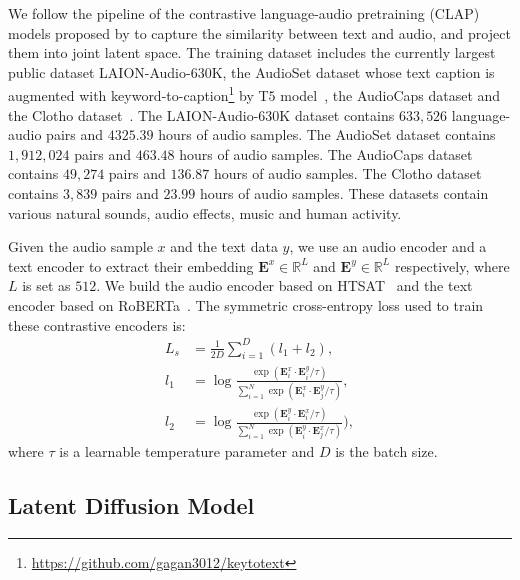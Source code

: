 \documentclass{article}
\begin{document}
We follow the pipeline of the contrastive language-audio pretraining (CLAP) models proposed by \cite{wu2022large} to capture the similarity between text and audio, and project them into joint latent space. The training dataset includes the currently largest public dataset LAION-Audio-$630$K, the AudioSet dataset whose text caption is augmented with keyword-to-caption\footnote{\url{https://github.com/gagan3012/keytotext}} by T$5$ model~\cite{T5}, the AudioCaps dataset and the Clotho dataset~\cite{Clotho}. The LAION-Audio-$630$K dataset contains $633,526$ language-audio pairs and $4325.39$ hours of audio samples. The AudioSet dataset contains $1,912,024$ pairs and $463.48$ hours of audio samples. The AudioCaps dataset contains $49,274$ pairs and $136.87$ hours of audio samples. The Clotho dataset contains $3,839$ pairs and $23.99$ hours of audio samples. These datasets contain various natural sounds, audio effects, music and human activity.

Given the audio sample $x$ and the text data $y$, we use an audio encoder and a text encoder to extract their embedding $\boldsymbol{E}^{x}\in \mathbb{R}^{L}$ and $\boldsymbol{E}^{y}\in \mathbb{R}^{L}$ respectively, where $L$ is set as $512$. We build the audio encoder based on HTSAT~\cite{HTSAT} and the text encoder based on RoBERTa~\cite{RoBERTa}. The symmetric cross-entropy loss used to train these contrastive encoders is:
\begin{align}
L_{s}&=\frac{1}{2D}\sum^{D}_{i=1}(l_{1} + l_{2}),\\
l_{1}&=\log\frac{\exp(\boldsymbol{E}^{x}_{i}\cdot \boldsymbol{E}^{y}_{i}/\tau)}{\sum^{N}_{i=1}\exp(\boldsymbol{E}^{x}_{i}\cdot \boldsymbol{E}^{y}_{j}/\tau)},\\
l_{2}&=\log\frac{\exp(\boldsymbol{E}^{y}_{i}\cdot \boldsymbol{E}^{x}_{i}/\tau)}{\sum^{N}_{i=1}\exp(\boldsymbol{E}^{y}_{i}\cdot \boldsymbol{E}^{x}_{j}/\tau)}),
\end{align}
where $\tau$ is a learnable temperature parameter and $D$ is the batch size. 

\subsection{Latent Diffusion Model}
\label{app:LDMArchitecture}
\end{document}
